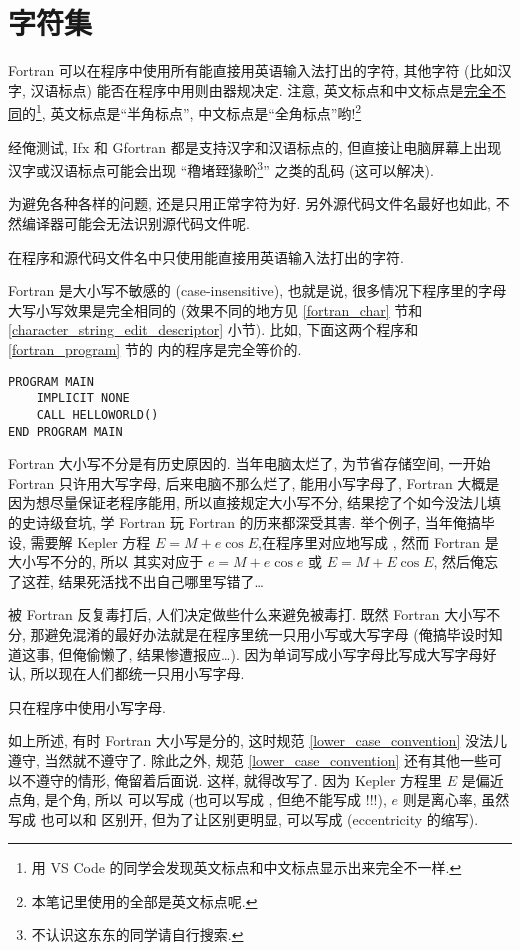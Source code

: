 \section{字符集}

Fortran 可以在程序中使用所有能直接用英语输入法打出的字符, 其他字符 (比如汉字, 汉语标点) 能否在程序中用则由器规决定. 注意, 英文标点和中文标点是\uline{完全不同}的\footnote{用 VS Code 的同学会发现英文标点和中文标点显示出来完全不一样.}, 英文标点是``半角标点'', 中文标点是``全角标点''哟!\footnote{本笔记里使用的全部是英文标点呢.}

经俺测试, Ifx 和 Gfortran 都是支持汉字和汉语标点的, 但直接让电脑屏幕上出现汉字或汉语标点可能会出现 ``穞堵臸猭畍\footnote{不认识这东东的同学请自行搜索.}'' 之类的乱码 (这可以解决).

为避免各种各样的问题, 还是只用正常字符为好. 另外源代码文件名最好也如此, 不然编译器可能会无法识别源代码文件呢.
\begin{convention}
    在程序和源代码文件名中只使用能直接用英语输入法打出的字符.\label{english_character_convention}
\end{convention}

Fortran 是大小写不敏感的 (case-insensitive), 也就是说, 很多情况下程序里的字母大写小写效果是完全相同的 (效果不同的地方见 \ref{fortran_char} 节和 \ref{character_string_edit_descriptor} 小节). 比如, 下面这两个程序和 \ref{fortran_program} 节的  内的程序是完全等价的.
\begin{lstlisting}
PROGRAM MAIN
    IMPLICIT NONE
    CALL HELLOWORLD()
END PROGRAM MAIN
\end{lstlisting}

Fortran 大小写不分是有历史原因的. 当年电脑太烂了, 为节省存储空间, 一开始 Fortran 只许用大写字母, 后来电脑不那么烂了, 能用小写字母了, Fortran 大概是因为想尽量保证老程序能用, 所以直接规定大小写不分, 结果挖了个如今没法儿填的史诗级奆坑, 学 Fortran 玩 Fortran 的历来都深受其害. 举个例子, 当年俺搞毕设, 需要解 Kepler 方程 $E=M+e\cos E$,在程序里对应地写成 , 然而 Fortran 是大小写不分的, 所以  其实对应于 $e=M+e\cos e$ 或 $E=M+E\cos E$, 然后俺忘了这茬, 结果死活找不出自己哪里写错了\dots{}

被 Fortran 反复毒打后, 人们决定做些什么来避免被毒打. 既然 Fortran 大小写不分, 那避免混淆的最好办法就是在程序里统一只用小写或大写字母 (俺搞毕设时知道这事, 但俺偷懒了, 结果惨遭报应\dots{}). 因为单词写成小写字母比写成大写字母好认, 所以现在人们都统一只用小写字母.
\begin{convention}
    只在程序中使用小写字母.\label{lower_case_convention}
\end{convention}
如上所述, 有时 Fortran 大小写是分的, 这时规范 \ref{lower_case_convention} 没法儿遵守, 当然就不遵守了. 除此之外, 规范 \ref{lower_case_convention} 还有其他一些可以不遵守的情形, 俺留着后面说. 这样,  就得改写了. 因为 Kepler 方程里 $E$ 是偏近点角, 是个角, 所以  可以写成  (也可以写成 , 但绝不能写成 !!!), $e$ 则是离心率, 虽然写成  也可以和  区别开, 但为了让区别更明显, 可以写成  (eccentricity 的缩写).

